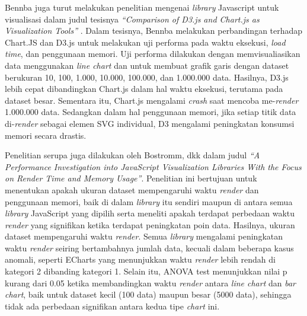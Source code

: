 Bennba juga turut melakukan penelitian mengenai \textit{library} Javascript untuk visualisasi dalam judul tesisnya \textit{“Comparison of D3.js and Chart.js as Visualization Tools”} \cite{Benbba2021}. Dalam tesisnya, Bennba melakukan perbandingan terhadap Chart.JS dan D3.js untuk melakukan uji performa pada waktu eksekusi, \textit{load time}, dan penggunaan memori. Uji performa dilakukan dengan memvisualiasikan data menggunakan \textit{line chart} dan untuk membuat grafik garis dengan dataset berukuran 10, 100, 1.000, 10.000, 100.000, dan 1.000.000 data. Hasilnya, D3.js lebih cepat dibandingkan Chart.js dalam hal waktu eksekusi, terutama pada dataset besar. Sementara itu, Chart.js mengalami \textit{crash} saat mencoba me-\textit{render} 1.000.000 data. Sedangkan dalam hal penggunaan memori, jika setiap titik data di-\textit{render} sebagai elemen SVG individual, D3 mengalami  peningkatan konsumsi memori secara drastis.

Penelitian serupa juga dilakukan oleh Bostromm, dkk \cite{Bostrm2022} dalam judul \textit{“A Performance Investigation into JavaScript Visualization Libraries With the Focus on Render Time and Memory Usage”}. Penelitian ini bertujuan untuk menentukan apakah ukuran dataset mempengaruhi waktu \textit{render} dan penggunaan memori, baik di dalam \textit{library} itu sendiri maupun di antara semua \textit{library} JavaScript yang dipilih serta meneliti apakah terdapat perbedaan waktu \textit{render} yang signifikan ketika terdapat peningkatan poin data. Hasilnya, ukuran dataset mempengaruhi waktu \textit{render}. Semua \textit{library} mengalami peningkatan waktu \textit{render} seiring bertambahnya jumlah data, kecuali dalam beberapa kasus anomali, seperti ECharts yang menunjukkan waktu \textit{render} lebih rendah di kategori 2 dibanding kategori 1. Selain itu, ANOVA test menunjukkan nilai p kurang dari 0.05 ketika membandingkan waktu \textit{render} antara \textit{line chart} dan \textit{bar chart}, baik untuk dataset kecil (100 data) maupun besar (5000 data), sehingga tidak ada perbedaan signifikan antara kedua tipe \textit{chart} ini. 

